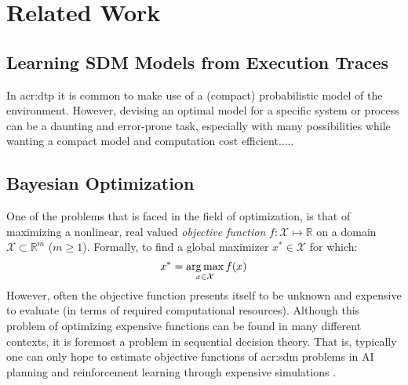 \chapter{Related Work}
\label{ch:related-work}


\section{Learning SDM Models from Execution Traces}
\label{sec:learning-models}

In \acrshort{acr:dtp} it is common to make use of a (compact) probabilistic model of the environment.
However, devising an optimal model for a specific system or process can be a daunting and error-prone task, especially with many possibilities while wanting a compact model and computation cost efficient.....



\section{Bayesian Optimization}
\label{sec:bayesian-optimization}

One of the problems that is faced in the field of optimization, is that of maximizing a nonlinear, real valued \textit{objective function} $f: \mathcal{X} \mapsto \mathbb{R}$ on a domain $\mathcal{X} \subset \mathbb{R}^m$ ($m \geq 1$).
Formally, to find a global maximizer $x^\ast \in \mathcal{X}$ for which:
\begin{equation}
	x^\ast = \operatorname*{arg\,max}_{x \in \mathcal{X}} f(x)
\end{equation}
However, often the objective function presents itself to be unknown and expensive to evaluate (in terms of required computational resources).
Although this problem of optimizing expensive functions can be found in many different contexts, it is foremost a problem in sequential decision theory. 
That is, typically one can only hope to estimate objective functions of \acrshort{acr:sdm} problems in AI planning and reinforcement learning through expensive simulations \cite{Brochu2010, Ghahramani2015}.

